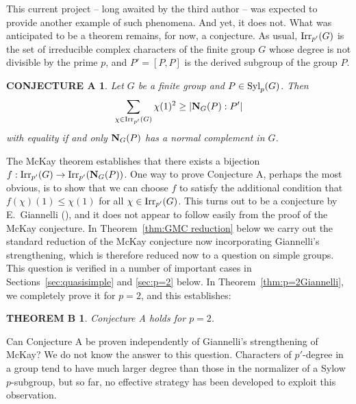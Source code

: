 \documentclass[12pt]{amsart}
\theoremstyle{plain}
\theoremstyle{definition}
\newtheorem*{thmB}{THEOREM B}
\newtheorem*{conjA}{CONJECTURE A}
\numberwithin{equation}{section}
\def\irrp#1{{\rm Irr}_{p'}(#1)}
\def\syl#1#2{{\rm Syl}_#1(#2)}
\def\norm#1#2{{\bf N}_{#1}(#2)}
\begin{document}
This current project -- long awaited by the third author -- was
expected to provide another example of such phenomena. And yet,
 it does not. What  was anticipated to be a theorem
remains, for now, a conjecture. As usual, $\irrp G$ is the set of
irreducible complex characters of the finite group $G$ whose degree
is not divisible by the prime $p$, and $P'=[P,P]$ is the derived
subgroup of the group $P$.
   \begin{conjA}\label{conj:A}
   {\sl Let $G$ be a finite group and $P \in \syl pG$.
   Then
   $$\sum_{\chi \in \irrp G} \chi(1)^2 \ge |\norm GP:P'|$$
   with equality if and only  $\norm GP$ has a normal complement in $G$.}
     \end{conjA}

The McKay theorem establishes that there exists a bijection $f:
\irrp G \rightarrow \irrp{\norm GP}$. One way to prove Conjecture A,
perhaps the most obvious,
 is to show that we can choose
$f$  to satisfy the additional condition   that $f(\chi)(1)\le
\chi(1)$ for all $\chi \in \irrp G$. This turns out to be a
conjecture by E.~Giannelli (\cite{G}), and it does not appear to
follow easily from the proof of the McKay conjecture. In
Theorem~\ref{thm:GMC reduction} below we carry out the standard
reduction of the McKay conjecture now incorporating Giannelli's
strengthening, which is therefore reduced now to a question on
simple groups.  This question is verified in a number of important
cases in Sections~\ref{sec:quasisimple} and \ref{sec:p=2} below. In
Theorem~\ref{thm:p=2Giannelli}, we completely prove it for $p=2$,
and this establishes:

       \begin{thmB}
   {\sl Conjecture A holds for $p=2$.}
     \end{thmB}

Can Conjecture A be proven independently of Giannelli's
strengthening of McKay? We do not know the answer to this question.
Characters of $p'$-degree in a group tend to have much larger degree
than those in the normalizer of a Sylow $p$-subgroup,  but so far,
no effective strategy has been developed to exploit this
observation.
\medskip


\end{document}
